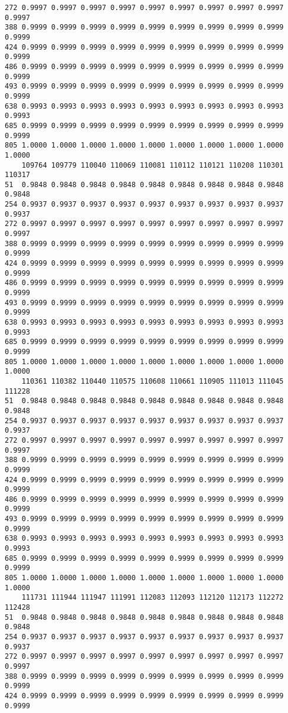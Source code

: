 \documentclass[
]{report}
\begin{document}
\begin{verbatim}
272 0.9997 0.9997 0.9997 0.9997 0.9997 0.9997 0.9997 0.9997 0.9997 0.9997
388 0.9999 0.9999 0.9999 0.9999 0.9999 0.9999 0.9999 0.9999 0.9999 0.9999
424 0.9999 0.9999 0.9999 0.9999 0.9999 0.9999 0.9999 0.9999 0.9999 0.9999
486 0.9999 0.9999 0.9999 0.9999 0.9999 0.9999 0.9999 0.9999 0.9999 0.9999
493 0.9999 0.9999 0.9999 0.9999 0.9999 0.9999 0.9999 0.9999 0.9999 0.9999
638 0.9993 0.9993 0.9993 0.9993 0.9993 0.9993 0.9993 0.9993 0.9993 0.9993
685 0.9999 0.9999 0.9999 0.9999 0.9999 0.9999 0.9999 0.9999 0.9999 0.9999
805 1.0000 1.0000 1.0000 1.0000 1.0000 1.0000 1.0000 1.0000 1.0000 1.0000
    109764 109779 110040 110069 110081 110112 110121 110208 110301 110317
51  0.9848 0.9848 0.9848 0.9848 0.9848 0.9848 0.9848 0.9848 0.9848 0.9848
254 0.9937 0.9937 0.9937 0.9937 0.9937 0.9937 0.9937 0.9937 0.9937 0.9937
272 0.9997 0.9997 0.9997 0.9997 0.9997 0.9997 0.9997 0.9997 0.9997 0.9997
388 0.9999 0.9999 0.9999 0.9999 0.9999 0.9999 0.9999 0.9999 0.9999 0.9999
424 0.9999 0.9999 0.9999 0.9999 0.9999 0.9999 0.9999 0.9999 0.9999 0.9999
486 0.9999 0.9999 0.9999 0.9999 0.9999 0.9999 0.9999 0.9999 0.9999 0.9999
493 0.9999 0.9999 0.9999 0.9999 0.9999 0.9999 0.9999 0.9999 0.9999 0.9999
638 0.9993 0.9993 0.9993 0.9993 0.9993 0.9993 0.9993 0.9993 0.9993 0.9993
685 0.9999 0.9999 0.9999 0.9999 0.9999 0.9999 0.9999 0.9999 0.9999 0.9999
805 1.0000 1.0000 1.0000 1.0000 1.0000 1.0000 1.0000 1.0000 1.0000 1.0000
    110361 110382 110440 110575 110608 110661 110905 111013 111045 111228
51  0.9848 0.9848 0.9848 0.9848 0.9848 0.9848 0.9848 0.9848 0.9848 0.9848
254 0.9937 0.9937 0.9937 0.9937 0.9937 0.9937 0.9937 0.9937 0.9937 0.9937
272 0.9997 0.9997 0.9997 0.9997 0.9997 0.9997 0.9997 0.9997 0.9997 0.9997
388 0.9999 0.9999 0.9999 0.9999 0.9999 0.9999 0.9999 0.9999 0.9999 0.9999
424 0.9999 0.9999 0.9999 0.9999 0.9999 0.9999 0.9999 0.9999 0.9999 0.9999
486 0.9999 0.9999 0.9999 0.9999 0.9999 0.9999 0.9999 0.9999 0.9999 0.9999
493 0.9999 0.9999 0.9999 0.9999 0.9999 0.9999 0.9999 0.9999 0.9999 0.9999
638 0.9993 0.9993 0.9993 0.9993 0.9993 0.9993 0.9993 0.9993 0.9993 0.9993
685 0.9999 0.9999 0.9999 0.9999 0.9999 0.9999 0.9999 0.9999 0.9999 0.9999
805 1.0000 1.0000 1.0000 1.0000 1.0000 1.0000 1.0000 1.0000 1.0000 1.0000
    111731 111944 111947 111991 112083 112093 112120 112173 112272 112428
51  0.9848 0.9848 0.9848 0.9848 0.9848 0.9848 0.9848 0.9848 0.9848 0.9848
254 0.9937 0.9937 0.9937 0.9937 0.9937 0.9937 0.9937 0.9937 0.9937 0.9937
272 0.9997 0.9997 0.9997 0.9997 0.9997 0.9997 0.9997 0.9997 0.9997 0.9997
388 0.9999 0.9999 0.9999 0.9999 0.9999 0.9999 0.9999 0.9999 0.9999 0.9999
424 0.9999 0.9999 0.9999 0.9999 0.9999 0.9999 0.9999 0.9999 0.9999 0.9999

\end{verbatim}
\end{document}
